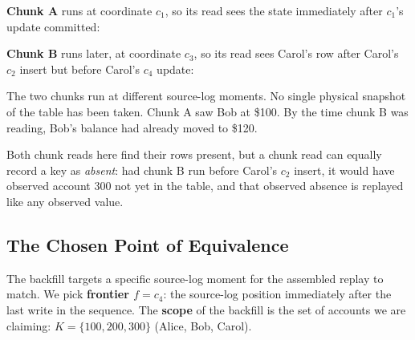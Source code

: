 \documentclass[letterpaper,10pt,twocolumn]{article}
\begin{document}
\textbf{Chunk A} runs at coordinate $c_1$, so its read sees
the state immediately after $c_1$'s update committed:

\begin{center}\footnotesize
{}
\end{center}

\textbf{Chunk B} runs later, at coordinate $c_3$, so its
read sees Carol's row after Carol's $c_2$ insert but before
Carol's $c_4$ update:

\begin{center}\footnotesize
{}
\end{center}

The two chunks run at different source-log moments. No single physical
snapshot of the table has been taken. Chunk A saw Bob at \$100. By the
time chunk B was reading, Bob's balance had already moved to \$120.

Both chunk reads here find their rows present, but a chunk read can
equally record a key as \emph{absent}: had chunk B run before Carol's
$c_2$ insert, it would have observed account 300 not yet in the table,
and that observed absence is replayed like any observed value.

\subsection{The Chosen Point of
Equivalence}\label{the-chosen-point-of-equivalence}

The backfill targets a specific source-log moment for the assembled
replay to match. We pick
\textbf{frontier $f = c_4$}: the source-log position
immediately after the last write in the sequence. The \textbf{scope} of the
backfill is the set of accounts we are claiming: $K = \{100, 200, 300\}$
(Alice, Bob, Carol).
\end{document}
